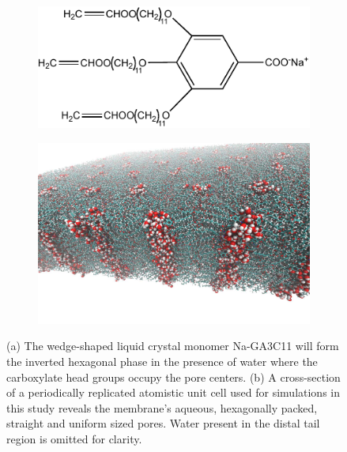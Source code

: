 \documentclass{article}
\begin{document}
  \begin{figure}
  \centering
  \begin{subfigure}{0.4\textwidth}
  \centering
  \includegraphics[width=\textwidth]{NaGA3C11.pdf}
  \caption{}\label{fig:monomer_structure}
  \end{subfigure}
  \begin{subfigure}{0.5\textwidth}
  \centering
  \includegraphics[width=\textwidth]{membrane_profile.pdf}
  \caption{}\label{fig:membrane_profile}
  \end{subfigure}
  \caption{(a) The wedge-shaped liquid crystal monomer Na-GA3C11 will form the inverted
  hexagonal phase in the presence of water where the carboxylate head groups occupy the
  pore centers. (b) A cross-section of a periodically replicated atomistic unit cell 
  used for simulations in this study reveals the membrane's aqueous, hexagonally packed,
  straight and uniform sized pores. Water present in the 
  distal tail region is omitted 
  for clarity.}\label{fig:membrane_structure}
  \end{figure}
  
\end{document}

